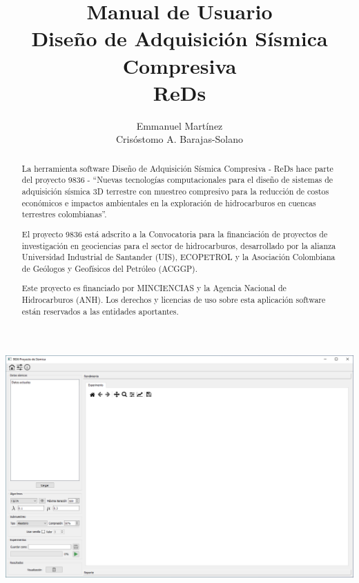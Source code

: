 \documentclass[12pt,oneside,letter]{ol-softwaremanual}
\title{\large{Manual de Usuario}\\ \vspace{10mm} \huge{Diseño de Adquisición Sísmica Compresiva}\\ \vspace{5mm} \huge{ReDs}}
\author{Emmanuel Martínez \\ Crisóstomo A. Barajas-Solano}
\begin{document}
\maketitle
\begin{center}
\includegraphics[width=.9\linewidth]{header.png}
\end{center}
\begin{abstract}
La herramienta software Diseño de Adquisición Sísmica Compresiva - ReDs hace parte del proyecto 9836 - ``Nuevas tecnologías computacionales para el diseño de sistemas de adquisición sísmica 3D terrestre con muestreo compresivo para la reducción de costos económicos e impactos ambientales en la exploración de hidrocarburos en cuencas terrestres colombianas''.

El proyecto 9836 está adscrito a la Convocatoria para la financiación de proyectos de investigación en geociencias para el sector de hidrocarburos, desarrollado por la alianza Universidad Industrial de Santander (UIS), ECOPETROL y la Asociación Colombiana de Geólogos y Geofísicos del Petróleo (ACGGP). 

Este proyecto es financiado por MINCIENCIAS y la Agencia Nacional de Hidrocarburos (ANH). Los derechos y licencias de uso sobre esta aplicación software están reservados a las entidades aportantes.
\end{abstract}
\end{document}
